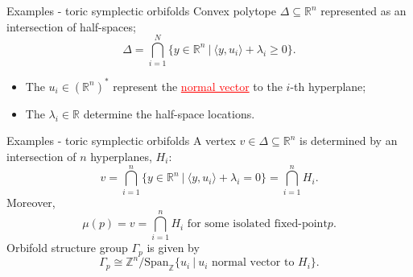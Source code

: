 \documentclass[aspectratio=169,xcolor=dvipsnames]{beamer}
\newcommand{\ZZ}{\mathbb{Z}}
\newcommand{\RR}{\mathbb{R}}
\newcommand{\Span}{\text{Span}}
\begin{document}
\begin{frame}{Examples - toric symplectic orbifolds}
	Convex polytope $\Delta \subseteq \RR^{n}$ represented as an intersection of half-spaces;
	\[
		\Delta = \bigcap_{i=1}^{N} \{ y \in \RR^{n}~|~\langle y, u_{i}\rangle + \lambda_{i} \geq 0 \}.
	\]
	\begin{itemize}
		\item The $u_{i} \in (\RR^{n})^{\ast}$ represent the \textcolor{red}{\underline{normal vector}} to the $i$-th hyperplane;
		\item The $\lambda_{i} \in \RR$ determine the half-space locations.
	\end{itemize}

	\begin{figure}[h!]
		\centering
	\end{figure}
\end{frame}

\begin{frame}{Examples - toric symplectic orbifolds}
	A vertex $v \in \Delta \subseteq \RR^{n}$ is determined by an intersection of $n$ hyperplanes, $H_{i}$:
	\[
	v = \bigcap_{i=1}^{n} \{ y \in \RR^{n}~|~\langle y, u_{i}\rangle + \lambda_{i} = 0 \} = \bigcap_{i=1}^{n} H_{i}.
	\]
	Moreover,
	\[
		\mu(p) = v = \bigcap_{i=1}^{n}H_{i} \text{ for some isolated fixed-point} p.
	\]
	Orbifold structure group $\Gamma_{p}$ is given by
	\[
		\Gamma_{p} \cong \ZZ^{n} / \Span_{\ZZ}\{u_{i}~|~u_{i} \text{ normal vector to } H_{i} \}.
	\]
\end{frame}
\end{document}
